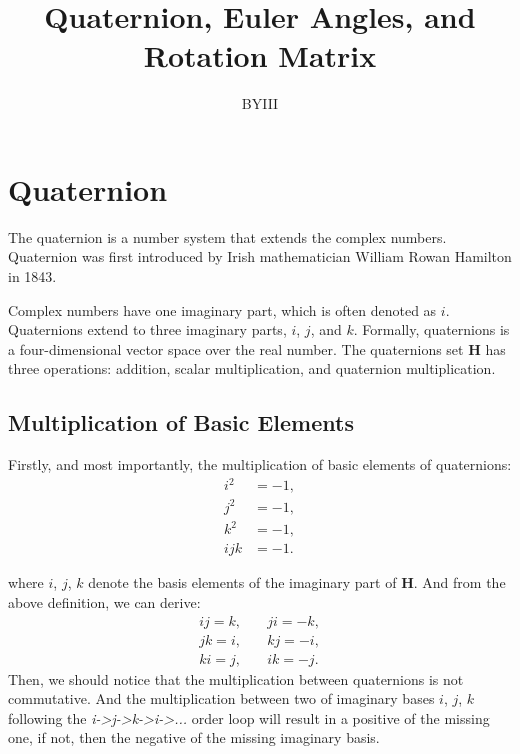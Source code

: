 \documentclass{article}
\begin{document}
\author{BYIII}
\title{Quaternion, Euler Angles, and Rotation Matrix}
\date{}

\maketitle

\section{Quaternion}

The quaternion is a number system that extends the complex numbers. Quaternion was first introduced by Irish mathematician William Rowan Hamilton in 1843.

Complex numbers have one imaginary part, which is often denoted as $i$. Quaternions extend to three imaginary parts, $i$, $j$, and $k$. Formally, quaternions is a four-dimensional vector space over the real number. The quaternions set \textbf{H} has three operations: addition, scalar multiplication, and quaternion multiplication.

\subsection{Multiplication of Basic Elements}

Firstly, and most importantly, the multiplication of basic elements of quaternions:
\begin{equation}
  \begin{split}
    i^2 &= -1, \\
    j^2 &= -1, \\
    k^2 &= -1, \\
    ijk &= -1.
  \end{split}
\end{equation}

where $i$, $j$, $k$ denote the basis elements of the imaginary part of \textbf{H}. And from the above definition, we can derive:
\begin{equation}
  \begin{split}
    ij = k, &\quad ji = -k, \\
    jk = i, &\quad kj = -i, \\
    ki = j, &\quad ik = -j.
  \end{split}
\end{equation}
Then, we should notice that the multiplication between quaternions is not commutative. And the multiplication between two of imaginary bases $i$, $j$, $k$ following the \textit{i->j->k->i->...} order loop will result in a positive of the missing one, if not, then the negative of the missing imaginary basis.
\end{document}
